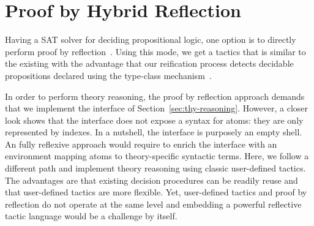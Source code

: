 \documentclass[utf8,a4paper,UKenglish,cleveref, autoref, thm-restate]{lipics-v2019}
\begin{document}
\section{Proof by Hybrid Reflection}
\label{sec:reflection}
Having a SAT solver for deciding propositional logic, one option is to
directly perform proof by
reflection~\cite[Chap. 16]{casteran:hal-00344237}. Using this mode, we
get a tactics that is similar to the existing  with the
advantage that our reification process detects decidable propositions
declared using the type-class mechanism~\cite{SozeauO08}.
%

In order to perform theory reasoning, the proof by reflection approach
demands that we implement the interface of
Section~\ref{sec:thy-reasoning}. However, a closer look shows that the
interface does not expose a syntax for atoms: they are only
represented by indexes. In a nutshell, the interface is purposely  an
empty shell. An fully reflexive approach would require to enrich the
interface with an environment mapping atoms to theory-specific
syntactic terms.
%
Here, we follow a different path and implement theory reasoning using
classic user-defined tactics.
%
The advantages are that existing decision procedures can be readily
reuse and that user-defined tactics are more flexible.
%
Yet, user-defined tactics and proof by reflection  do not
operate at the same level and embedding a powerful reflective tactic language
would be a challenge by itself.
\end{document}
